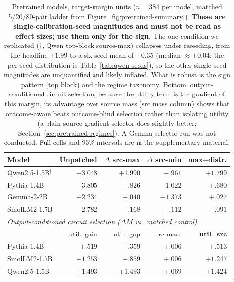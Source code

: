 \documentclass{article}
\newcommand{\helpful}[1]{\textcolor{pennblue}{\bfseries #1}}
\newcommand{\harmful}[1]{\textcolor{pennred}{\bfseries #1}}
\newcommand{\neutral}[1]{\textcolor{controlgray}{#1}}
\begin{document}
\begin{table}[!t]
\centering
\small
\setlength{\tabcolsep}{3pt}
\begin{tabular*}{\columnwidth}{@{\extracolsep{\fill}}lrrrr}
\toprule
Model & Unpatched & $\Delta$ src-max & $\Delta$ src-min & \textbf{max$-$distr.} \\
\midrule
Qwen2.5-1.5B$^\dagger$ & $-3.048$ & \helpful{$+1.990$} & \harmful{$-.961$} & \helpful{$+1.799$} \\
Pythia-1.4B & $-3.805$ & \helpful{$+.826$} & \harmful{$-1.022$} & \helpful{$+.680$} \\
Gemma-2-2B & $+2.234$ & \helpful{$+.040$} & \harmful{$-1.373$} & \helpful{$+.027$} \\
SmolLM2-1.7B & $-2.782$ & \harmful{$-.168$} & \harmful{$-.112$} & \harmful{$-.091$} \\
\midrule
\multicolumn{5}{l}{\emph{Output-conditioned circuit selection ($\Delta M$ vs.\ matched control)}} \\
 & util.\ gain & util.\ gap & src mass & \textbf{util$-$src} \\
\midrule
Pythia-1.4B & \helpful{$+.519$} & \helpful{$+.359$} & \neutral{$+.006$} & \helpful{$+.513$} \\
SmolLM2-1.7B & \helpful{$+1.253$} & \helpful{$+.859$} & \neutral{$+.006$} & \helpful{$+1.247$} \\
Qwen2.5-1.5B & \helpful{$+1.493$} & \helpful{$+1.493$} & \helpful{$+.069$} & \helpful{$+1.424$} \\
\bottomrule
\end{tabular*}
\caption{Pretrained models, target-margin units ($n=384$ per model, matched 5/20/80-pair ladder from
Figure~\ref{fig:pretrained-summary}). \textbf{These are single-calibration-seed magnitudes and must not be read
as effect sizes; use them only for the sign.} The one condition we replicated ($\dagger$, Qwen top-block
source-max) collapses under reseeding, from the headline $+1.99$ to a six-seed mean of $+0.35$ (median
$\approx+0.04$; the per-seed distribution is Table~\ref{tab:qwen-seeds}), so the other single-seed magnitudes
are unquantified and likely inflated. What is robust is the sign pattern (top block) and the regime taxonomy.
Bottom: output-conditioned circuit selection; because the utility term is the gradient of this margin, its
advantage over source mass (src mass column) shows that outcome-aware beats outcome-blind selection rather than
isolating utility (a plain source-gradient selector does slightly better; Section~\ref{sec:pretrained-regimes}). A
Gemma selector run was not conducted. Full cells and $95\%$ intervals are in the supplementary material.}
\label{tab:evidence-summary}
\end{table}
\end{document}
